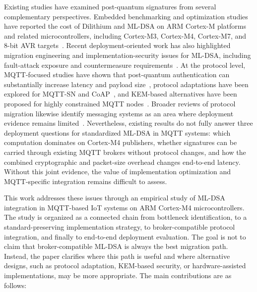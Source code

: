 \documentclass[final, twoside]{IEEEtran} %
\begin{document}
Existing studies have examined post-quantum signatures from several complementary perspectives. Embedded benchmarking and optimization studies have reported the cost of Dilithium and ML-DSA on ARM Cortex-M platforms and related microcontrollers, including Cortex-M3, Cortex-M4, Cortex-M7, and 8-bit AVR targets~\cite{Banegas2021,Benchmark2022,pqm4-benchmarks,Barrett2023}. Recent deployment-oriented work has also highlighted migration engineering and implementation-security issues for ML-DSA, including fault-attack exposure and countermeasure requirements~\cite{Li2024,Dinu2025}. At the protocol level, MQTT-focused studies have shown that post-quantum authentication can substantially increase latency and payload size~\cite{Samandari2023,Rampazzo2023}, protocol adaptations have been explored for MQTT-SN and CoAP~\cite{BlancoRomero2024}, and KEM-based alternatives have been proposed for highly constrained MQTT nodes~\cite{Kim2025}. Broader reviews of protocol migration likewise identify messaging systems as an area where deployment evidence remains limited~\cite{Egbuagha2025}. Nevertheless, existing results do not fully answer three deployment questions for standardized ML-DSA in MQTT systems: which computation dominates on Cortex-M4 publishers, whether signatures can be carried through existing MQTT brokers without protocol changes, and how the combined cryptographic and packet-size overhead changes end-to-end latency. Without this joint evidence, the value of implementation optimization and MQTT-specific integration remains difficult to assess.

This work addresses these issues through an empirical study of ML-DSA integration in MQTT-based IoT systems on ARM Cortex-M4 microcontrollers. The study is organized as a connected chain from bottleneck identification, to a standard-preserving implementation strategy, to broker-compatible protocol integration, and finally to end-to-end deployment evaluation. The goal is not to claim that broker-compatible ML-DSA is always the best migration path. Instead, the paper clarifies where this path is useful and where alternative designs, such as protocol adaptation, KEM-based security, or hardware-assisted implementations, may be more appropriate. The main contributions are as follows:
\end{document}
